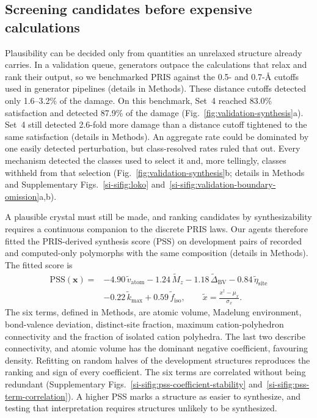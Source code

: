 \subsection{Screening candidates before expensive calculations}
\label{sec:certified}

Plausibility can be decided only from quantities an unrelaxed structure
already carries. In a validation queue, generators outpace the calculations that
relax and rank their output, so we benchmarked PRIS against
the 0.5- and 0.7-\AA{} cutoffs used in generator pipelines
\cite{xie2022crystal,betala2025lematgenbench} (details in Methods). These distance cutoffs detected only
1.6--3.2\% of the damage. On this benchmark, Set~4 reached 83.0\% satisfaction and detected
87.9\% of the damage (Fig.~\ref{fig:validation-synthesis}a). Set~4 still detected
2.6-fold more damage than a distance cutoff tightened to the same satisfaction (details in Methods).
An aggregate rate could be dominated by one easily detected perturbation, but
class-resolved rates ruled that out. Every mechanism detected the classes used to select it
and, more tellingly, classes withheld from that selection
\cite{geirhos2020shortcut,torralba2011unbiased,lapuschkin2019unmasking}
(Fig.~\ref{fig:validation-synthesis}b; details in Methods and Supplementary
Figs.~\ref{si-sifig:loko} and~\ref{si-sifig:validation-boundary-omission}a,b).

\label{sec:pauling}\label{sec:database}\label{sec:scores}\label{sec:formulas}

A plausible crystal must still be made, and ranking candidates by synthesizability requires a
continuous companion to the discrete PRIS laws. Our agents therefore fitted the
PRIS-derived synthesis score (PSS) on development pairs of recorded and computed-only
polymorphs with the same composition (details in Methods). The fitted score is
\begin{equation}
\begin{aligned}
  \mathrm{PSS}(\mathbf{x})={}&-4.90\,\widetilde v_{\mathrm{atom}}
  -1.24\,\widetilde M_z-1.18\,\widetilde\Delta_{\mathrm{BV}}
  -0.84\,\widetilde\eta_{\mathrm{site}} \\
  &-0.22\,\widetilde k_{\max}+0.59\,\widetilde f_{\mathrm{iso}},
  \qquad \widetilde x=\frac{x^\dagger-\mu_x}{\sigma_x}.
\end{aligned}
\label{eq:pss}
\end{equation}
The six terms, defined in Methods, are atomic volume, Madelung environment, bond-valence
deviation, distinct-site fraction, maximum cation-polyhedron connectivity and the fraction
of isolated cation polyhedra. The last two describe connectivity, and atomic volume has
the dominant negative coefficient, favouring density. Refitting on random halves of the
development structures reproduces the ranking and sign of every coefficient. The six terms
are correlated without being redundant (Supplementary
Figs.~\ref{si-sifig:pss-coefficient-stability} and~\ref{si-sifig:pss-term-correlation}). A
higher PSS marks a structure as easier to synthesize, and testing that
interpretation requires structures unlikely to be synthesized.

